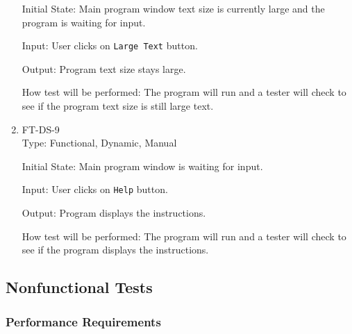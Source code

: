 \documentclass[12pt, titlepage]{article}
\begin{document}
\begin{enumerate}
Initial State: Main program window text size is currently large and the program is waiting for input. %

Input: User clicks on \texttt{Large Text} button.

Output: Program text size stays large.

How test will be performed: The program will run and a tester will check to see if the program text size is still large text.

\item{FT-DS-9}\\
Type: Functional, Dynamic, Manual

Initial State: Main program window is waiting for input. %

Input: User clicks on \texttt{Help} button.

Output: Program displays the instructions.

How test will be performed: The program will run and a tester will check to see if the program displays the instructions.
\end{enumerate}

\subsection{Nonfunctional Tests}

\subsubsection{Performance Requirements}
\end{document}
